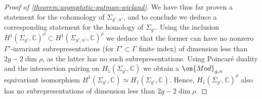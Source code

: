 \begin{proof}[Proof of \autoref{theorem:asymptotic-putman-wieland}]
We have  thus far proven a statement for the cohomology of $\Sigma_{g',n'}$, and to
conclude we deduce a corresponding statement for the homology of $\Sigma_{g'}$.
Using the inclusion
$H^1(\Sigma_{g'}, \mathbb C)^\rho \subset H^1(\Sigma_{g', n'}, \mathbb{C})^\rho$
we deduce that the former can have no nonzero $\Gamma'$-invariant subrepresentations
(for $\Gamma' \subset \Gamma$ finite index)
of dimension less than $2g - 2\dim \rho$, as the latter has no such
subrepresentations.
Using Poincar\'e duality and the intersection pairing on $H_1(\Sigma_{g'}, \mathbb C)$
we obtain a $\on{Mod}_{g,n}$ equivariant isomorphism
$H^1(\Sigma_{g'},\mathbb C) \simeq H_1(\Sigma_{g'},\mathbb C)$.
Hence, $H_1(\Sigma_{g'}, \mathbb C)^\rho$ also has no subrepresentations of
dimension less than $2g - 2\dim\rho$.
\end{proof}
